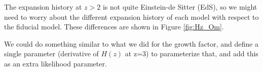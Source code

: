 The expansion history at $z>2$ is not quite Einstein-de Sitter (EdS), so 
we might need to worry about the different expansion history of each model
with respect to the fiducial model. 
These differences are shown in Figure \ref{fig:Hz_Om}.

We could do something similar to what we did for the growth factor, and 
define a single parameter (derivative of $H(z)$ at z=3) to parameterize 
that, and add this as an extra likelihood parameter.
